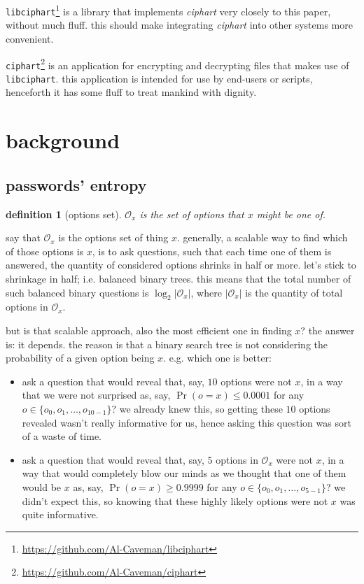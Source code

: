 \documentclass[twocolumn]{article}
\newtheorem{definition}{definition}
\begin{document}
\texttt{libciphart}\footnote{\url{https://github.com/Al-Caveman/libciphart}}
is a library that implements \emph{ciphart} very closely to this paper,
without much fluff.  this should make integrating \emph{ciphart} into other
systems more convenient.

\texttt{ciphart}\footnote{\url{https://github.com/Al-Caveman/ciphart}} is
an application for encrypting and decrypting files that makes use of
\texttt{libciphart}.  this application is intended for use by end-users or
scripts, henceforth it has some fluff to treat mankind with dignity.

\break
\tableofcontents

\section{background}
\subsection{passwords' entropy}\label{sec_pass_entropy}
\begin{definition}[options set]
    $\mathcal{O}_x$ is the set of options that $x$ might be one of.
\end{definition}

say that $\mathcal{O}_x$ is the options set of thing $x$.  generally, a
scalable way to find which of those options is $x$, is to ask questions,
such that each time one of them is answered, the quantity of considered
options shrinks in half or more.  let's stick to shrinkage in half; i.e.
balanced binary trees.  this means that the total number of such balanced
binary questions is $\log_2 |\mathcal{O}_x|$, where $|\mathcal{O}_x|$ is
the quantity of total options in $\mathcal{O}_x$.

but is that scalable approach, also the most efficient one in finding $x$?
the answer is: it depends.  the reason is that a binary search tree is not
considering the probability of a given option being $x$.  e.g. which one is
better:
\begin{itemize}
    \item ask a question that would reveal that, say, $10$ options were not
    $x$, in a way that we were not surprised  as, say, $\Pr(o = x) \le
    0.0001$ for any $o \in \{o_0, o_1, \ldots, o_{10-1}\}$?  we already
    knew this, so getting these $10$ options revealed wasn't really
    informative for us, hence asking this question was sort of a waste of
    time.

    \item ask a question that would reveal that, say, $5$ options in
    $\mathcal{O}_x$ were not $x$, in a way that would completely blow our
    minds as we thought that one of them would be $x$ as, say, $\Pr(o = x)
    \ge 0.9999$ for any $o \in \{o_0, o_1, \ldots, o_{5-1}\}$?  we didn't
    expect this, so knowing that these highly likely options were not $x$
    was quite informative.
\end{itemize}
\end{document}
